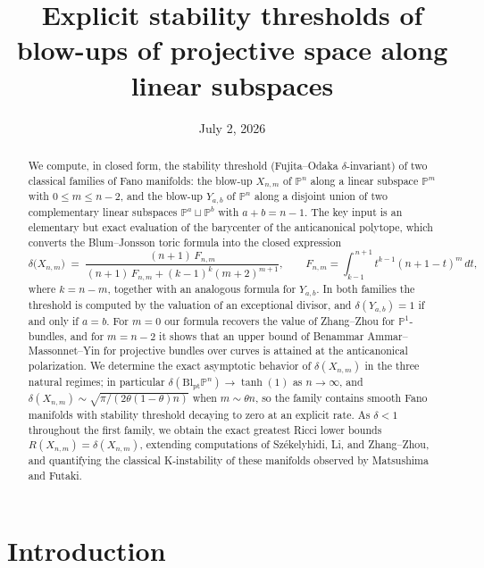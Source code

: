 \documentclass[11pt]{amsart}
\title[Stability thresholds of blow-ups along linear subspaces]{Explicit stability thresholds of blow-ups of projective space along linear subspaces}
\date{July 2, 2026}
\theoremstyle{definition}
\theoremstyle{remark}
\newcommand{\PP}{\mathbb{P}}
\newcommand{\Bl}{\mathrm{Bl}}
\begin{document}
\begin{abstract}
We compute, in closed form, the stability threshold (Fujita--Odaka
$\delta$-invariant) of two classical families of Fano manifolds: the
blow-up $X_{n,m}$ of $\PP^n$ along a linear subspace $\PP^m$ with
$0\le m\le n-2$, and the blow-up $Y_{a,b}$ of $\PP^n$ along a disjoint
union of two complementary linear subspaces $\PP^a\sqcup\PP^b$ with
$a+b=n-1$. The key input is an elementary but exact evaluation of the
barycenter of the anticanonical polytope, which converts the
Blum--Jonsson toric formula into the closed expression
\[
\delta\bigl(X_{n,m}\bigr)
 \;=\;
 \frac{(n+1)\,F_{n,m}}{(n+1)\,F_{n,m}+(k-1)^{k}(m+2)^{m+1}},
 \qquad
 F_{n,m}=\int_{k-1}^{\,n+1} t^{k-1}(n+1-t)^{m}\,dt,
\]
where $k=n-m$, together with an analogous formula for $Y_{a,b}$. In both
families the threshold is computed by the valuation of an exceptional
divisor, and $\delta(Y_{a,b})=1$ if and only if $a=b$. For $m=0$ our
formula recovers the value of Zhang--Zhou for
$\PP^1$-bundles, and for $m=n-2$ it shows that an upper bound of
Benammar Ammar--Massonnet--Yin for projective bundles over curves is
attained at the anticanonical polarization. We determine the exact
asymptotic behavior of $\delta(X_{n,m})$ in the three natural regimes;
in particular $\delta(\Bl_{\mathrm{pt}}\PP^n)\to\tanh(1)$ as
$n\to\infty$, and $\delta(X_{n,m})\sim\sqrt{\pi/(2\theta(1-\theta)n)}$
when $m\sim\theta n$, so the family contains smooth Fano manifolds with
stability threshold decaying to zero at an explicit rate. As
$\delta<1$ throughout the first family, we obtain the exact greatest
Ricci lower bounds $R(X_{n,m})=\delta(X_{n,m})$, extending computations
of Sz\'ekelyhidi, Li, and Zhang--Zhou, and quantifying the classical
K-instability of these manifolds observed by Matsushima and Futaki.
\end{abstract}

\maketitle

\section{Introduction}\label{sec:intro}
\end{document}
